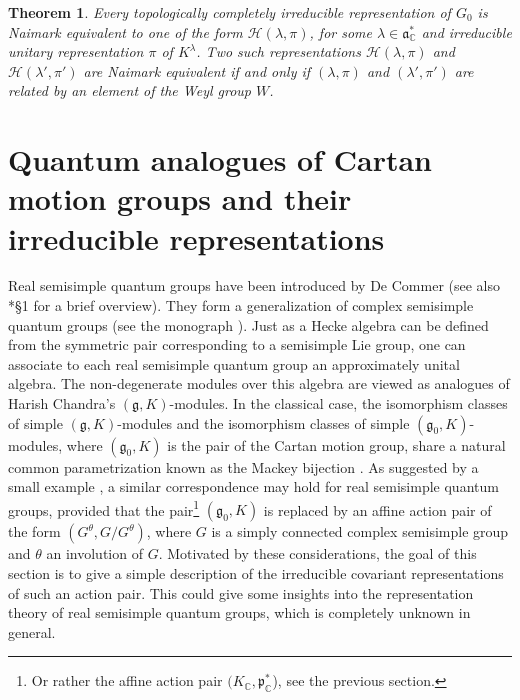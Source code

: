 \documentclass{amsart}
\newtheorem{theorem}{Theorem}
\theoremstyle{definition}
\begin{document}
\begin{theorem}
    Every topologically completely irreducible representation of $G_0$ is Naimark equivalent to one of the form $\mathcal{H}(\lambda, \pi)$, for some $\lambda \in \mathfrak{a}^*_\mathbb{C}$ and irreducible unitary representation $\pi$ of $K^\lambda$. Two such representations $\mathcal{H}(\lambda, \pi)$ and $\mathcal{H}(\lambda', \pi')$ are Naimark equivalent if and only if $(\lambda, \pi)$ and $(\lambda', \pi')$ are related by an element of the Weyl group $W$.
\end{theorem}

\section{Quantum analogues of Cartan motion groups and their irreducible representations}

Real semisimple quantum groups have been introduced by De Commer \cite{DCquantisation} (see also \cite{YGE}*{§1} for a brief overview). They form a generalization of complex semisimple quantum groups (see the monograph \cite{VoigtYuncken}). Just as a Hecke algebra can be defined from the symmetric pair corresponding to a semisimple Lie group, one can associate to each real semisimple quantum group an approximately unital algebra. The non-degenerate modules over this algebra are viewed as analogues of Harish Chandra's $(\mathfrak{g},K)$-modules. In the classical case, the isomorphism classes of simple $(\mathfrak{g},K)$-modules and the isomorphism classes of simple $(\mathfrak{g}_0,K)$-modules, where $(\mathfrak{g}_0,K)$ is the pair of the Cartan motion group, share a natural common parametrization known as the Mackey bijection \cites{Afgoustidis1}. As suggested by a small example \cite{YGE}, a similar correspondence may hold for real semisimple quantum groups, provided that the pair\footnote{Or rather the affine action pair $(K_\mathbb{C}, \mathfrak{p}_\mathbb{C}^*$), see the previous section.} $(\mathfrak{g}_0,K)$ is replaced by an affine action pair of the form $(G^\theta, G /G^\theta)$, where $G$ is a simply connected complex semisimple group and $\theta$ an involution of $G$. Motivated by these considerations, the goal of this section is to give a simple description of the irreducible covariant representations of such an action pair. This could give some insights into the representation theory of real semisimple quantum groups, which is completely unknown in general.
\end{document}
